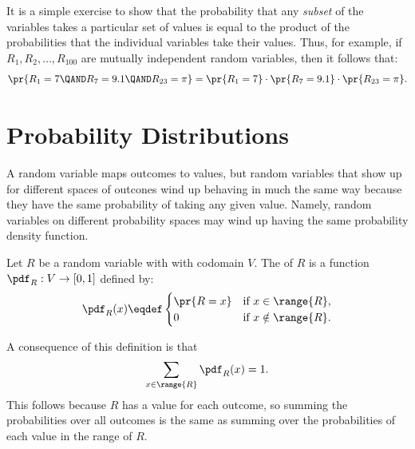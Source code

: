 It is a simple exercise to show that the probability that any
\emph{subset} of the variables takes a particular set of values is equal
to the product of the probabilities that the individual variables take
their values.  Thus, for example, if $R_1, R_2, \dots, R_{100}$ are
mutually independent random variables, then it follows that:
\[
\pr{R_1 = 7 \QAND R_7 = 9.1 \QAND R_{23} = \pi} = \pr{R_1 = 7} \cdot
\pr{R_7 = 9.1} \cdot \pr{R_{23} = \pi}.
\]



\section{Probability Distributions}\label{distributions_sec}

A random variable maps outcomes to values, but random variables that show
up for different spaces of outcones wind up behaving in much the same way
because they have the same probability of taking any given value.  Namely,
random variables on different probability spaces may wind up having the
same probability density function.

\begin{definition}
Let $R$ be a random variable with with codomain $V$.
The  of $R$
is a function $\pdf_R : V \to [0,1]$ defined by:
%
\[
\pdf_R(x) \eqdef \begin{cases}
            \pr{R = x} & \text{if } x \in \range{R},\\
             0 & \text{if } x \notin \range{R}.
           \end{cases}
\]
\end{definition}
%
A consequence of this definition is that
%
\[
\sum_{x \in \range{R}} \pdf_R(x) = 1.
\]
This follows because $R$ has a value for each outcome, so summing the
probabilities over all outcomes is the same as summing over the
probabilities of each value in the range of $R$.

